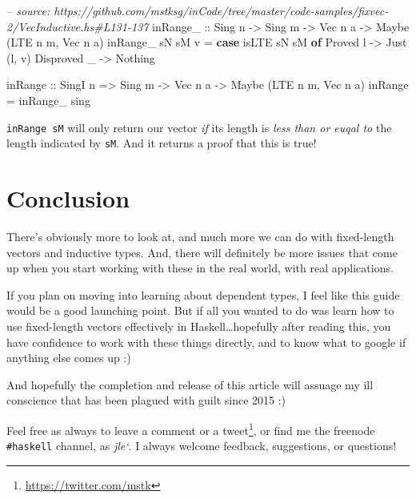 \documentclass[]{article}
\newenvironment{Shaded}{}{}
\newcommand{\KeywordTok}[1]{\textcolor[rgb]{0.00,0.44,0.13}{\textbf{#1}}}
\newcommand{\DataTypeTok}[1]{\textcolor[rgb]{0.56,0.13,0.00}{#1}}
\newcommand{\CommentTok}[1]{\textcolor[rgb]{0.38,0.63,0.69}{\textit{#1}}}
\newcommand{\OtherTok}[1]{\textcolor[rgb]{0.00,0.44,0.13}{#1}}
\newcommand{\FunctionTok}[1]{\textcolor[rgb]{0.02,0.16,0.49}{#1}}
\newcommand{\NormalTok}[1]{#1}
\renewcommand{\href}[2]{#2\footnote{\url{#1}}}
\begin{document}
\begin{Shaded}
\begin{Highlighting}[]
\CommentTok{-- source: https://github.com/mstksg/inCode/tree/master/code-samples/fixvec-2/VecInductive.hs#L131-137}
\OtherTok{inRange_ ::} \DataTypeTok{Sing}\NormalTok{ n }\OtherTok{->} \DataTypeTok{Sing}\NormalTok{ m }\OtherTok{->} \DataTypeTok{Vec}\NormalTok{ n a }\OtherTok{->} \DataTypeTok{Maybe}\NormalTok{ (}\DataTypeTok{LTE}\NormalTok{ n m, }\DataTypeTok{Vec}\NormalTok{ n a)}
\NormalTok{inRange_ sN sM v }\FunctionTok{=} \KeywordTok{case}\NormalTok{ isLTE sN sM }\KeywordTok{of}
    \DataTypeTok{Proved}\NormalTok{ l    }\OtherTok{->} \DataTypeTok{Just}\NormalTok{ (l, v)}
    \DataTypeTok{Disproved}\NormalTok{ _ }\OtherTok{->} \DataTypeTok{Nothing}

\NormalTok{inRange}\OtherTok{ ::} \DataTypeTok{SingI}\NormalTok{ n }\OtherTok{=>} \DataTypeTok{Sing}\NormalTok{ m }\OtherTok{->} \DataTypeTok{Vec}\NormalTok{ n a }\OtherTok{->} \DataTypeTok{Maybe}\NormalTok{ (}\DataTypeTok{LTE}\NormalTok{ n m, }\DataTypeTok{Vec}\NormalTok{ n a)}
\NormalTok{inRange }\FunctionTok{=}\NormalTok{ inRange_ sing}
\end{Highlighting}
\end{Shaded}

\texttt{inRange\ sM} will only return our vector \emph{if} its length is
\emph{less than or euqal to} the length indicated by \texttt{sM}. And it returns
a proof that this is true!

\section{Conclusion}\label{conclusion}

There's obviously more to look at, and much more we can do with fixed-length
vectors and inductive types. And, there will definitely be more issues that come
up when you start working with these in the real world, with real applications.

If you plan on moving into learning about dependent types, I feel like this
guide would be a good launching point. But if all you wanted to do was learn how
to use fixed-length vectors effectively in Haskell\ldots{}hopefully after
reading this, you have confidence to work with these things directly, and to
know what to google if anything else comes up :)

And hopefully the completion and release of this article will assuage my ill
conscience that has been plagued with guilt since 2015 :)

Feel free as always to leave a comment or a
\href{https://twitter.com/mstk}{tweet}, or find me the freenode
\texttt{\#haskell} channel, as \emph{jle`}. I always welcome feedback,
suggestions, or questions!
\end{document}
